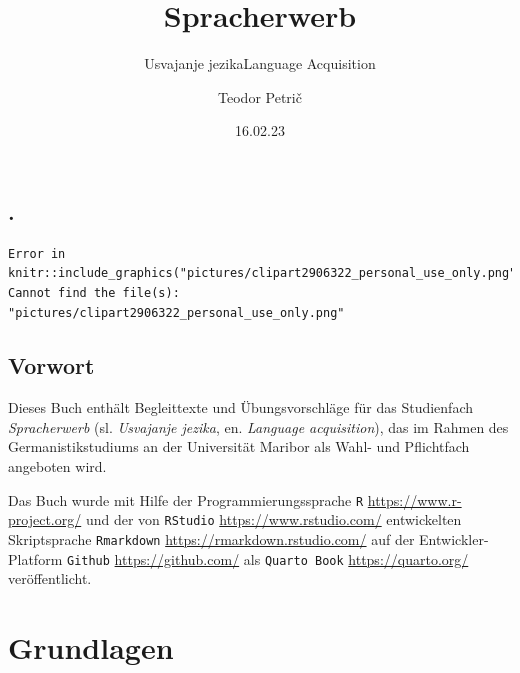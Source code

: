 \documentclass[
  letterpaper,
]{scrbook}
\title{Spracherwerb}
\subtitle{Usvajanje jezikaLanguage Acquisition}
\author{Teodor Petrič}
\date{16.02.23}
\renewcommand*\contentsname{Table of contents}
\newcommand\contentsname{Table of contents}
\begin{document}
\frontmatter
\maketitle
\ifdefined\Shaded\renewenvironment{Shaded}{\begin{tcolorbox}[sharp corners, borderline west={3pt}{0pt}{shadecolor}, interior hidden, breakable, enhanced, boxrule=0pt, frame hidden]}{\end{tcolorbox}}\fi

\renewcommand*\contentsname{Table of contents}
{
\setcounter{tocdepth}{2}
\tableofcontents
}
\mainmatter
{}

\hypertarget{section}{%
\chapter*{.}\label{section}}


\begin{verbatim}
Error in knitr::include_graphics("pictures/clipart2906322_personal_use_only.png"): Cannot find the file(s): "pictures/clipart2906322_personal_use_only.png"
\end{verbatim}


\hypertarget{sec-vorwort}{%
\chapter*{Vorwort}\label{sec-vorwort}}


Dieses Buch enthält Begleittexte und Übungsvorschläge für das
Studienfach \emph{Spracherwerb} (sl. \emph{Usvajanje jezika}, en.
\emph{Language acquisition}), das im Rahmen des Germanistikstudiums an
der Universität Maribor als Wahl- und Pflichtfach angeboten wird.

Das Buch wurde mit Hilfe der Programmierungssprache \texttt{R}
\url{https://www.r-project.org/} und der von \texttt{RStudio}
\url{https://www.rstudio.com/} entwickelten Skriptsprache
\texttt{Rmarkdown} \url{https://rmarkdown.rstudio.com/} auf der
Entwickler-Platform \texttt{Github} \url{https://github.com/} als
\texttt{Quarto\ Book} \url{https://quarto.org/} veröffentlicht.

\part{Grundlagen}
\end{document}
